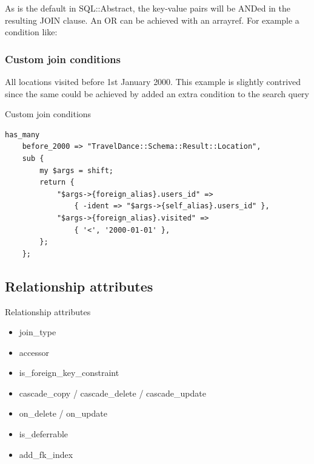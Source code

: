 As is the default in SQL::Abstract, the key-value pairs will be ANDed in the
resulting JOIN clause. An OR can be achieved with an arrayref. For example a
condition like:


\subsubsection{Custom join conditions}

All locations visited before 1st January 2000. This example is slightly
contrived since the same could be achieved by added an extra condition to
the search query

\begin{frame}[fragile]{Custom join conditions}
\begin{lstlisting}
has_many
    before_2000 => "TravelDance::Schema::Result::Location",
    sub {
        my $args = shift;
        return {
            "$args->{foreign_alias}.users_id" =>
                { -ident => "$args->{self_alias}.users_id" },
            "$args->{foreign_alias}.visited" =>
                { '<', '2000-01-01' },
        };
    };
\end{lstlisting}
\end{frame}

\subsection{Relationship attributes}


\begin{frame}{Relationship attributes}
\begin{itemize}
\item join\_type
\item accessor
\item is\_foreign\_key\_constraint
\item cascade\_copy / cascade\_delete / cascade\_update
\item on\_delete / on\_update
\item is\_deferrable
\item add\_fk\_index
\end{itemize}
\end{frame}

